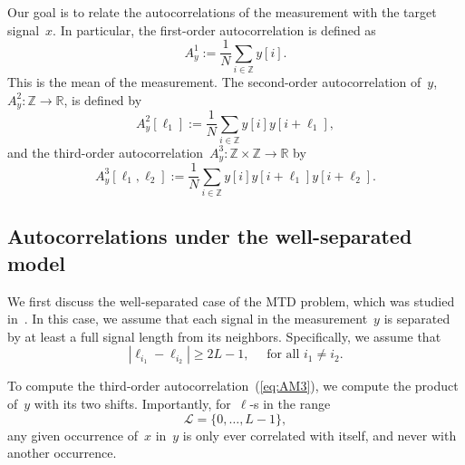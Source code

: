 \documentclass{article}
\begin{document}
Our goal is to relate the autocorrelations of the measurement with the target signal~$x$. In particular, the first-order autocorrelation is defined as
\begin{equation}
\label{eq:AM1}
A_{y}^1 := \frac{1}{N} \sum_{i \in \mathbb{Z}} y[i].
\end{equation}
This is the mean of the measurement. The second-order autocorrelation of~$y$, \mbox{$A_{y}^2: \mathbb{Z} \rightarrow \mathbb{R}$}, is defined by
\begin{equation}
\label{eq:AM2}
A_{y}^2 [\ell_1] := \frac{1}{N} \sum_{i \in \mathbb{Z}} y[i] y[i + \ell_1],
\end{equation}
and the third-order autocorrelation~\mbox{$A_{y}^3: \mathbb{Z} \times \mathbb{Z} \rightarrow \mathbb{R}$} by
\begin{equation}
\label{eq:AM3}
A_{y}^3 [\ell_1, \ell_2] := \frac{1}{N} \sum_{i \in \mathbb{Z}} y[i] y[i + \ell_1] y[i + \ell_2].
\end{equation}


\subsection{Autocorrelations under the well-separated model}
\label{subsec:relations}
We first discuss the \mbox{well-separated} case of the MTD problem, which was studied in~\cite{bendory2019multi}. In this case, we assume that each signal in the measurement~$y$ is separated by at least a full signal length from its neighbors. Specifically, we assume that
\begin{equation}
\label{eq:sep}
|\ell_{i_1} - \ell_{i_2}| \ge 2L - 1, \quad \text{ for all } i_1 \ne i_2.
\end{equation}

To compute the third-order autocorrelation~(\ref{eq:AM3}), we compute the product of~$y$ with its two shifts. Importantly, for~\mbox{$\ell$-s} in the range
\begin{equation}
\label{eq:set_L}
\mathcal{L} = \{0, \ldots, {L - 1}\},
\end{equation}
any given occurrence of~$x$ in~$y$ is only ever correlated with itself, and never with another occurrence.
\end{document}
